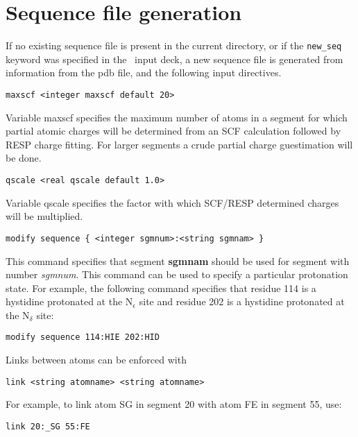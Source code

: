 \section{Sequence file generation}

If no existing sequence file is present in the current directory,
or if the \verb+new_seq+ keyword was specified in the \prepare\ 
input deck, a new sequence file is generated from information
from the pdb file, and the following input directives.

\begin{verbatim}
maxscf <integer maxscf default 20>
\end{verbatim}

Variable maxscf specifies the maximum number of atoms in a segment for
which partial atomic charges will be determined from an SCF calculation
followed by RESP charge fitting. For larger segments a crude partial
charge guestimation will be done.

\begin{verbatim}
qscale <real qscale default 1.0>
\end{verbatim}

Variable qscale specifies the factor with which SCF/RESP determined
charges will be multiplied.

\begin{verbatim}
modify sequence { <integer sgmnum>:<string sgmnam> }
\end{verbatim}

This command specifies that segment {\bf sgmnam} should be used
for segment with number {\it sgmnum}. This command can be used
to specify a particular protonation state. For example, the
following command specifies that residue 114 is a hystidine
protonated at the N$_\epsilon$ site and residue 202 is a hystidine
protonated at the N$_\delta$ site:

\begin{verbatim}
modify sequence 114:HIE 202:HID
\end{verbatim}

Links between atoms can be enforced with

\begin{verbatim}
link <string atomname> <string atomname>
\end{verbatim}

For example, to link atom {\rm SG} in segment 20 with atom {\rm FE}
in segment 55, use:

\begin{verbatim}
link 20:_SG 55:FE
\end{verbatim}

